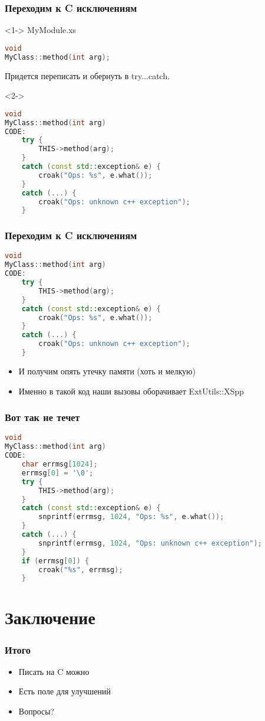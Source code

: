 \documentclass[pdflatex,hyperref={unicode=true}]{beamer}
\DeclareRobustCommand{\cpp}{
    \texorpdfstring{\hbox{C\hspace{-0.5ex}\protect\raisebox{0.5ex}{\protect\scalebox{0.67}{++}}}}{C++}
}
\begin{document}
\begin{frame}[fragile]
    \frametitle{Переходим к \cpp исключениям}
    \begin{onlyenv}<1->
        MyModule.xs
        \begin{lstlisting}[language=C++,style=PerlXS]
void
MyClass::method(int arg);
        \end{lstlisting}
        Придется переписать и обернуть в try...catch.
    \end{onlyenv}
    \begin{onlyenv}<2->
        \begin{lstlisting}[language=C++,style=PerlXS]
void
MyClass::method(int arg)
CODE:
    try {
        THIS->method(arg);
    }
    catch (const std::exception& e) {
        croak("Ops: %s", e.what());
    }
    catch (...) {
        croak("Ops: unknown c++ exception");
    }
        \end{lstlisting}
    \end{onlyenv}
\end{frame}

\begin{frame}[fragile]
    \frametitle{Переходим к \cpp исключениям}
    \begin{lstlisting}[language=C++,style=PerlXS]
void
MyClass::method(int arg)
CODE:
    try {
        THIS->method(arg);
    }
    catch (const std::exception& e) {
        croak("Ops: %s", e.what());
    }
    catch (...) {
        croak("Ops: unknown c++ exception");
    }
    \end{lstlisting}
    \begin{itemize}
        \item<2-| alert@2-> И получим опять утечку памяти (хоть и мелкую)
        \item<3-> Именно в такой код наши вызовы оборачивает ExtUtils::XSpp
    \end{itemize}
\end{frame}

\begin{frame}[fragile]
    \frametitle{Вот так не течет}
    \begin{lstlisting}[language=C++,style=PerlXS]
void
MyClass::method(int arg)
CODE:
    char errmsg[1024];
    errmsg[0] = '\0';
    try {
        THIS->method(arg);
    }
    catch (const std::exception& e) {
        snprintf(errmsg, 1024, "Ops: %s", e.what());
    }
    catch (...) {
        snprintf(errmsg, 1024, "Ops: unknown c++ exception");
    }
    if (errmsg[0]) {
        croak("%s", errmsg);
    }
    \end{lstlisting}
\end{frame}

\section{Заключение}

\begin{frame}
    \frametitle{Итого}
    \begin{itemize}[<+->]
        \item Писать на \cpp можно
        \item Есть поле для улучшений
        \item Вопросы?
    \end{itemize}
\end{frame}
\end{document}

